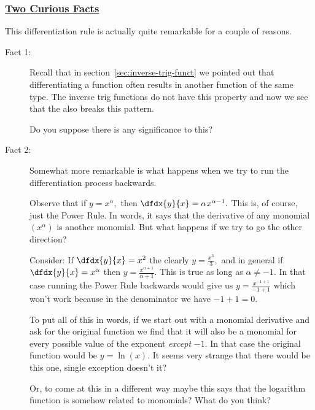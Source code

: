 \subsubsection*{\underline{Two  Curious Facts}}
This differentiation rule is actually quite remarkable
for a couple of reasons.
\begin{description}
\item[Fact 1:] Recall that in
  section~\ref{sec:inverse-trig-funct} we pointed out that
  differentiating a function often results in another function of the
  same type.  The inverse trig functions do not have this property and
  now we see that the  also breaks this
  pattern.

  Do you suppose there is any significance to this?
\item[Fact 2:] 
  Somewhat more remarkable is what happens when we try to run the
  differentiation process backwards.

  Observe that if $y=x^\alpha,$ then
  $\dfdx{y}{x}=\alpha x^{\alpha-1}.$ This is, of course, just the
  Power Rule. In words, it says that the derivative of any monomial
  $(x^\alpha)$ is another monomial. But what happens if we try to go
  the other direction?

  Consider: If $\dfdx{y}{x}=x^2$ the clearly $y=\frac{x^3}{3},$ and in
  general if $\dfdx{y}{x}=x^\alpha$ then
  $y= \frac{x^{\alpha+1}}{\alpha+1}.$ This is true as long as
  $\alpha\ne -1.$ In that case running the Power Rule backwards would
  give us $y= \frac{x^{-1+1}}{-1+1}$ which won't work because in the
  denominator we have $-1+1=0.$

  To put all of this in words, if we start out with a monomial
  derivative and ask for the original function we find that it will
  also be a monomial for every possible value of the exponent
  \emph{except} $-1.$ In that case the original function would be
  $y=\ln(x).$ It seems very strange that there would be this one,
  single exception doesn't it?

  Or, to come at this in a different way maybe this says that the
  logarithm function is somehow related to monomials? What do you
  think?
\end{description}

